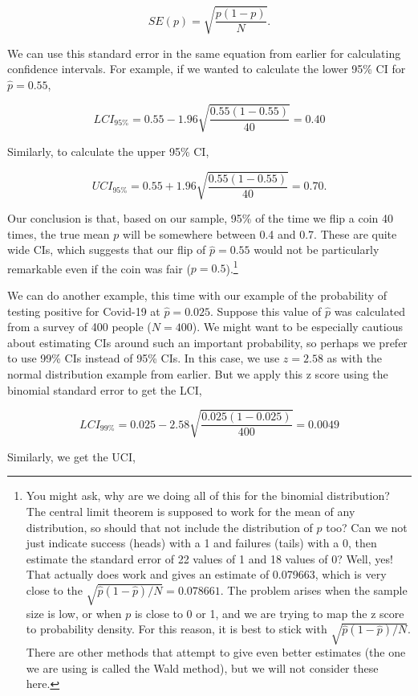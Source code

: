 \documentclass[
]{scrbook}
\begin{document}
\[SE(p) = \sqrt{\frac{p\left(1 - p\right)}{N}}.\]

We can use this standard error in the same equation from earlier for calculating confidence intervals.
For example, if we wanted to calculate the lower 95\% CI for \(\hat{p} = 0.55\),

\[LCI_{95\%} = 0.55 - 1.96 \sqrt{\frac{0.55\left(1 - 0.55\right)}{40}} = 0.40\]

Similarly, to calculate the upper 95\% CI,

\[UCI_{95\%} = 0.55 + 1.96 \sqrt{\frac{0.55\left(1 - 0.55\right)}{40}} = 0.70.\]

Our conclusion is that, based on our sample, 95\% of the time we flip a coin 40 times, the true mean \(p\) will be somewhere between 0.4 and 0.7.
These are quite wide CIs, which suggests that our flip of \(\hat{p} = 0.55\) would not be particularly remarkable even if the coin was fair (\(p = 0.5\)).\footnote{You might ask, why are we doing all of this for the binomial distribution? The central limit theorem is supposed to work for the mean of any distribution, so should that not include the distribution of \(p\) too? Can we not just indicate success (heads) with a 1 and failures (tails) with a 0, then estimate the standard error of 22 values of 1 and 18 values of 0? Well, yes! That actually does work and gives an estimate of 0.079663, which is very close to the \(\sqrt{\hat{p}(1-\hat{p})/N} = 0.078661\). The problem arises when the sample size is low, or when \(p\) is close to 0 or 1, and we are trying to map the z score to probability density. For this reason, it is best to stick with \(\sqrt{\hat{p}(1-\hat{p})/N}\). There are other methods that attempt to give even better estimates (the one we are using is called the Wald method), but we will not consider these here.}

We can do another example, this time with our example of the probability of testing positive for Covid-19 at \(\hat{p} = 0.025\).
Suppose this value of \(\hat{p}\) was calculated from a survey of 400 people (\(N = 400\)).
We might want to be especially cautious about estimating CIs around such an important probability, so perhaps we prefer to use 99\% CIs instead of 95\% CIs.
In this case, we use \(z = 2.58\) as with the normal distribution example from earlier.
But we apply this z score using the binomial standard error to get the LCI,

\[LCI_{99\%} = 0.025 - 2.58 \sqrt{\frac{0.025\left(1 - 0.025\right)}{400}} = 0.0049\]

Similarly, we get the UCI,
\end{document}
